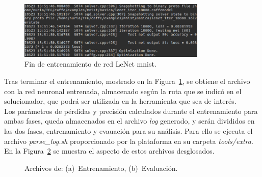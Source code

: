 	\begin{figure}[H]
		\begin{center}
			\includegraphics[width=0.8\textwidth]{figures/RedBasicaFin}
			\caption{Fin de entrenamiento de red LeNet \acrshort{mnist}.}
			\label{fig.finEntrBas}
		\end{center}
	\end{figure}
	
	Tras terminar el entrenamiento, mostrado en la Figura~\ref{fig.finEntrBas}, se obtiene el archivo con la red neuronal entrenada, almacenado según la ruta que se indicó en el solucionador, que podrá ser utilizada en la herramienta que sea de interés.\\

	Los parámetros de pérdidas y precisión calculados durante el entrenamiento para ambas fases, queda almacenados en el archivo \textit{log} generado, y serán divididos en las dos fases, entrenamiento y evauación para su análisis. Para ello se ejecuta el archivo \textit{parse\_log.sh} proporcionado por la plataforma en su carpeta \textit{tools/extra}. En la Figura~\ref{fig.parse} se muestra el aspecto de estos archivos desglosados.
	\vspace{10pt}
	
	\begin{figure}[H]
			\centering
			 \hspace{10pt}
			\caption{Archivos  de: (a)~Entrenamiento, (b)~Evaluación.}
			\label{fig.parse}
	\end{figure}

